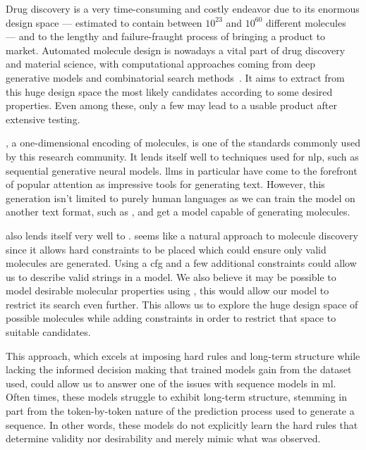 \documentclass[../Document.tex]{subfiles}
\begin{document}
\label{chap:introduction}

Drug discovery is a very time-consuming and costly endeavor due to its enormous design space
--- estimated to contain between $10^{23}$ and $10^{60}$ different molecules~\cite{molecule-space} --- and to the lengthy and failure-fraught process of bringing a product to market.
Automated molecule design is nowadays a vital part of drug discovery and material science, with computational approaches coming from deep generative models and combinatorial search methods~\cite{du2022molgensurvey}.
It aims to extract from this huge design space the most likely candidates according to some desired properties.
Even among these, only a few may lead to a usable product after extensive testing.

\smiles, a one-dimensional encoding of molecules, is one of the standards commonly used by this research community.
It lends itself well to techniques used for \gls{nlp}, such as sequential generative neural models.
\glspl{llm} in particular have come to the forefront of popular attention as impressive tools for generating text.
However, this generation isn't limited to purely human languages as we can train the model on another text format, such as \smiles, and get a model capable of generating molecules.

\smiles also lends itself very well to \cp. \cp seems like a natural approach to molecule discovery since it allows hard constraints to be placed which could ensure only valid molecules are generated.
Using a \gls{cfg} and a few additional constraints could allow us to describe valid \smiles strings in a \cp model.
We also believe it may be possible to model desirable molecular properties using \cp, this would allow our model to restrict its search even further.
This allows us to explore the huge design space of possible molecules while adding constraints in order to restrict that space to suitable candidates.

This \cp approach, which excels at imposing hard rules and long-term structure while lacking the informed decision making that trained models gain from the dataset used, could allow us to answer one of the issues with sequence models in \gls{ml}.
Often times, these models struggle to exhibit long-term structure, stemming in part from the token-by-token nature of the prediction process used to generate a sequence.
In other words, these models do not explicitly learn the hard rules that determine validity nor desirability and merely mimic what was observed.
\end{document}
